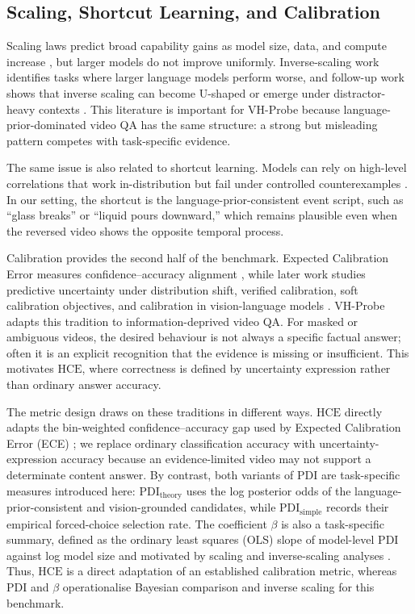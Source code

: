 \documentclass[final,5p,times,twocolumn]{elsarticle}
\newcommand{\PDI}{\mathrm{PDI}}
\newcommand{\HCE}{\mathrm{HCE}}
\begin{document}
\subsection{Scaling, Shortcut Learning, and Calibration}

Scaling laws predict broad capability gains as model size, data, and compute
increase \cite{kaplan2020scaling,hoffmann2022training}, but larger models do
not improve uniformly. Inverse-scaling work identifies tasks where larger
language models perform worse, and follow-up work shows that inverse scaling
can become U-shaped or emerge under distractor-heavy contexts
\cite{mckenzie2023inverse,wei2023inverse,shi2023large}. This literature is
important for VH-Probe because language-prior-dominated video QA has the same structure:
a strong but misleading pattern competes with task-specific evidence.

The same issue is also related to shortcut learning. Models can rely on
high-level correlations that work in-distribution but fail under controlled
counterexamples \cite{geirhos2020shortcut}. In our setting, the shortcut is the
language-prior-consistent event script, such as ``glass breaks'' or ``liquid
pours downward,'' which remains plausible even when the reversed video shows the
opposite temporal process.

Calibration provides the second half of the benchmark. Expected Calibration
Error measures confidence--accuracy alignment \cite{guo2017calibration}, while
later work studies predictive uncertainty under distribution shift, verified
calibration, soft calibration objectives, and calibration in vision-language
models \cite{lakshminarayanan2017simple,ovadia2019can,kumar2019verified,karandikar2021soft,tu2024empirical}.
VH-Probe adapts this tradition to information-deprived video QA. For masked or
ambiguous videos, the desired behaviour is not always a specific factual answer;
often it is an explicit recognition that the evidence is missing or
insufficient. This motivates $\HCE$, where correctness is defined by
uncertainty expression rather than ordinary answer accuracy.

The metric design draws on these traditions in different ways. $\HCE$ directly
adapts the bin-weighted confidence--accuracy gap used by Expected Calibration
Error (ECE) \cite{naeini2015obtaining,guo2017calibration}; we replace ordinary
classification accuracy with uncertainty-expression accuracy because an
evidence-limited video may not support a determinate content answer. By
contrast, both variants of $\PDI$ are task-specific measures introduced here:
$\PDI_{\mathrm{theory}}$ uses the log posterior odds of the
language-prior-consistent and vision-grounded candidates, while
$\PDI_{\mathrm{simple}}$ records their empirical forced-choice selection rate.
The coefficient $\beta$ is also a task-specific summary, defined as the
ordinary least squares (OLS) slope of model-level $\PDI$ against log model
size and motivated by scaling and inverse-scaling analyses
\cite{kaplan2020scaling,mckenzie2023inverse}. Thus, $\HCE$ is a direct
adaptation of an established calibration metric, whereas $\PDI$ and $\beta$
operationalise Bayesian comparison and inverse scaling for this benchmark.
\end{document}
